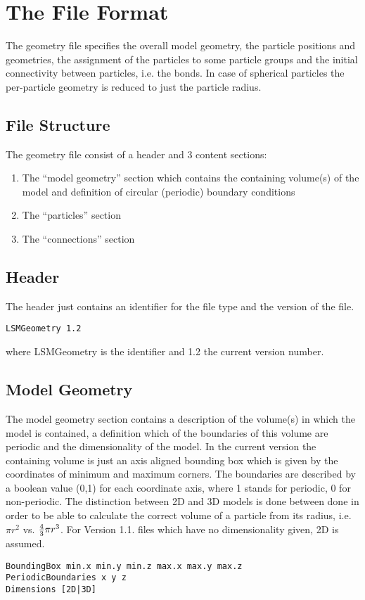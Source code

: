 \section{The File Format}

The geometry file specifies the overall model geometry, the particle positions and geometries, the assignment of the particles to some particle groups and the initial connectivity between particles, i.e. the bonds. In case of spherical particles the per-particle geometry is reduced to just the particle radius. 
\subsection{File Structure}
The geometry file consist of a header and 3 content sections:
\begin{enumerate}
\item The ``model geometry'' section which contains the containing volume(s) of the model and definition of circular (periodic) boundary conditions
\item The ``particles'' section
\item The ``connections'' section 
\end{enumerate}
\subsection{Header}
The header just contains an identifier for the file type and the version of the file. 
\begin{verbatim}
LSMGeometry 1.2
\end{verbatim}
where \textsf{LSMGeometry} is the identifier and \textsf{1.2} the current version number.


\subsection{Model Geometry}

The model geometry section contains a description of the volume(s) in which the model is contained, a definition which of the boundaries of this volume are periodic and the dimensionality of the model. In the current version the containing volume is just an axis aligned bounding box which is given by the coordinates of minimum and maximum corners. The boundaries are described by a boolean value (0,1) for each coordinate axis, where 1 stands for periodic, 0 for non-periodic. The distinction between 2D and 3D models is done between done in order to be able to calculate the correct volume of a particle from its radius, i.e. $\pi r^2$ vs. ${4 \over 3} \pi r^3$. For Version 1.1. files which have no dimensionality given, 2D is assumed.
\begin{verbatim}
BoundingBox min.x min.y min.z max.x max.y max.z
PeriodicBoundaries x y z
Dimensions [2D|3D]
\end{verbatim}


